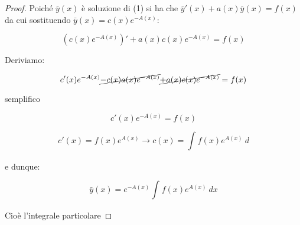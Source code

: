 \documentclass[11pt]{article}
\begin{document}
\newpage
\begin{proof}
    Poiché $\bar y(x)$ è soluzione di (1) si ha che $\bar y'(x)+a(x) \bar y(x)=f(x)$ da cui sostituendo $\bar y(x) = c(x) e ^{-A(x)}$:

    \[
        (c(x) e ^{-A(x)})'+ a(x) c(x) e ^{-A(x)} = f(x)
    \]
    
    Deriviamo:

    \[
        c'(x) e ^{-A(x)} \cancel{- c(x) a(x) e ^{-A(x)}} \cancel{+ a(x) c(x) e ^{-A(x)}}= f(x)
    \]
    
    semplifico

    \[
        c'(x) e ^{-A(x)} = f(x)
    \]

    \[
        c'(x) = f(x) e ^{A(x)} \rightarrow c(x) = \int_{{}}^{{}} {f(x) e ^{A(x)}} \: d{} {}
    \]

    e dunque:

    \[
        \bar y(x) = e ^{-A(x)} \int_{{}}^{{}} {f(x) e ^{A(x)}} \: d{x} {}
    \]

    Cioè l'integrale particolare
\end{proof}
\newpage
{}
\end{document}
